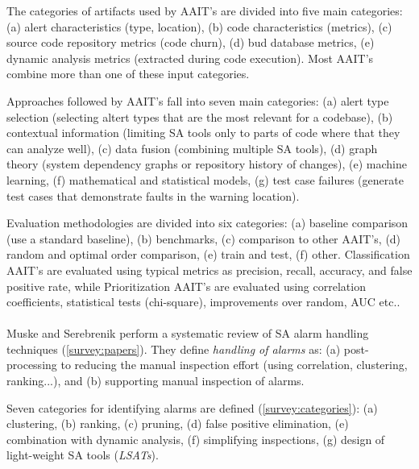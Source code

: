  The categories of artifacts used by AAIT's are divided into five main categories: (a) alert characteristics (type, location), (b) code characteristics (metrics), (c) source code repository metrics (code churn), (d) bud database metrics, (e) dynamic analysis metrics (extracted during code execution). Most AAIT's combine more than one of these input categories.

 Approaches followed by AAIT's fall into seven main categories: (a) alert type selection (selecting altert types that are the most relevant for a codebase), (b) contextual information (limiting SA tools only to parts of code where that they can analyze well), (c) data fusion (combining multiple SA tools), (d) graph theory (system dependency graphs or repository history of changes), (e) machine learning, (f) mathematical and statistical models, (g) test case failures (generate test cases that demonstrate faults in the warning location). 

 Evaluation methodologies are divided into six categories: (a) baseline comparison (use a standard baseline), (b) benchmarks, (c) comparison to other AAIT's, (d) random and optimal order comparison, (e) train and test, (f) other.
 Classification AAIT's are evaluated using typical metrics as precision, recall, accuracy, and false positive rate, while Prioritization AAIT's are evaluated using correlation coefficients, statistical tests (chi-square), improvements over random, AUC etc..\\\\


 Muske and Serebrenik \cite{survey_approaches} perform a systematic review of SA alarm handling techniques (\cref{survey:papers}). They define \textit{handling of alarms}  as: (a) post-processing to reducing the manual inspection effort (using correlation, clustering, ranking...), and (b) supporting manual inspection of alarms.

 Seven categories for identifying alarms are defined (\cref{survey:categories}): (a) clustering, (b) ranking, (c) pruning, (d) false positive elimination, (e) combination with dynamic analysis, (f) simplifying inspections, (g) design of light-weight SA tools (\textit{LSATs}).

